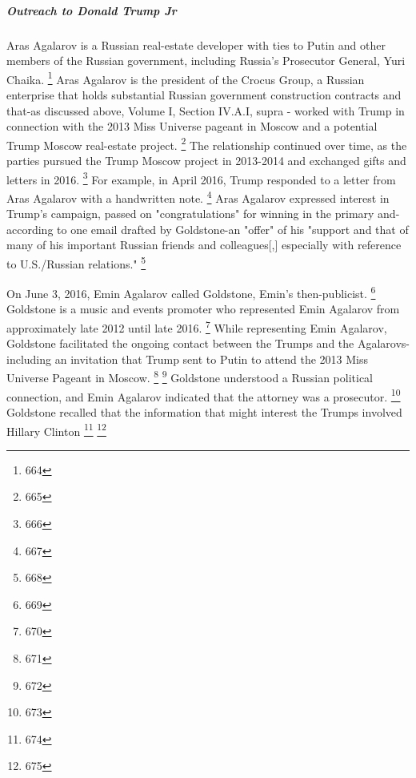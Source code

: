 \subparagraph{Outreach to Donald Trump Jr}

Aras Agalarov is a Russian real-estate developer with ties to Putin and other members of the Russian government, including Russia's Prosecutor General, Yuri Chaika.%
\footnote{664}
Aras Agalarov is the president of the Crocus Group, a Russian enterprise that holds substantial Russian government construction contracts and that-as discussed above, Volume I, Section IV.A.I, supra - worked with Trump in connection with the 2013 Miss Universe pageant in Moscow and a potential Trump Moscow real-estate project.%
\footnote{665}
The relationship continued over time, as the parties pursued the Trump Moscow project in 2013-2014 and exchanged gifts and letters in 2016.%
\footnote{666}
For example, in April 2016, Trump responded to a letter from Aras Agalarov with a handwritten note.%
\footnote{667}
Aras Agalarov expressed interest in Trump's campaign, passed on "congratulations" for winning in the primary and-according to one email drafted by Goldstone-an "offer" of his "support and that of many of his important Russian friends and colleagues[,] especially with reference to U.S./Russian relations."%
\footnote{668}

On June 3, 2016, Emin Agalarov called Goldstone, Emin's then-publicist.%
\footnote{669}
Goldstone is a music and events promoter who represented Emin Agalarov from approximately late 2012 until late 2016.%
\footnote{670}
While representing Emin Agalarov, Goldstone facilitated the ongoing contact between the Trumps and the Agalarovs-including an invitation that Trump sent to Putin to attend the 2013 Miss Universe Pageant in Moscow.%
\footnote{671}
\footnote{672}
Goldstone understood
a Russian political connection, and Emin Agalarov indicated that the attorney was a prosecutor.%
\footnote{673}
Goldstone recalled that the information that might interest the Trumps involved Hillary Clinton
\footnote{674}
\footnote{675}

